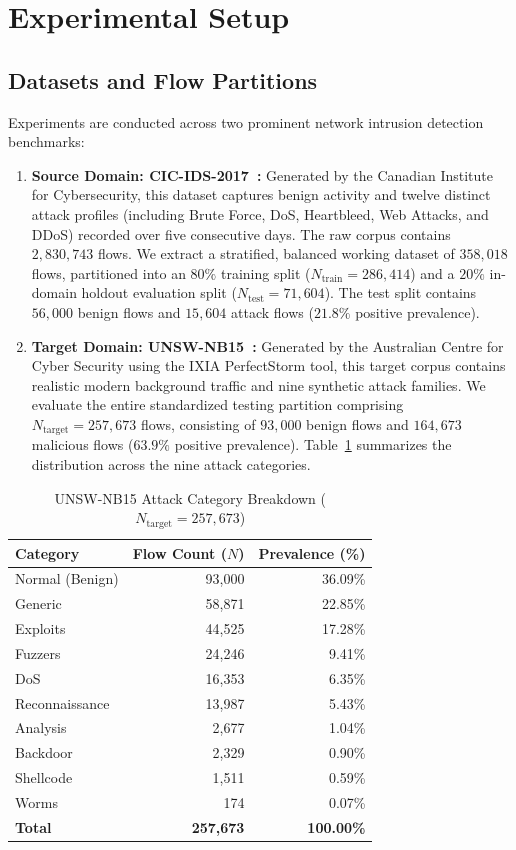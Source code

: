 \section{Experimental Setup}
\label{sec:setup}

\subsection{Datasets and Flow Partitions}
Experiments are conducted across two prominent network intrusion detection benchmarks:
\begin{enumerate}
    \item \textbf{Source Domain: CIC-IDS-2017~\cite{sharafaldin2018cicids}:} Generated by the Canadian Institute for Cybersecurity, this dataset captures benign activity and twelve distinct attack profiles (including Brute Force, DoS, Heartbleed, Web Attacks, and DDoS) recorded over five consecutive days. The raw corpus contains $2,830,743$ flows. We extract a stratified, balanced working dataset of $358,018$ flows, partitioned into an $80\%$ training split ($N_{\text{train}} = 286,414$) and a $20\%$ in-domain holdout evaluation split ($N_{\text{test}} = 71,604$). The test split contains $56,000$ benign flows and $15,604$ attack flows ($21.8\%$ positive prevalence).
    \item \textbf{Target Domain: UNSW-NB15~\cite{moustafa2015unsw}:} Generated by the Australian Centre for Cyber Security using the IXIA PerfectStorm tool, this target corpus contains realistic modern background traffic and nine synthetic attack families. We evaluate the entire standardized testing partition comprising $N_{\text{target}} = 257,673$ flows, consisting of $93,000$ benign flows and $164,673$ malicious flows ($63.9\%$ positive prevalence). Table~\ref{tab:attack_distribution} summarizes the distribution across the nine attack categories.
\end{enumerate}

\begin{table}[h]
\centering
\caption{UNSW-NB15 Attack Category Breakdown ($N_{\text{target}} = 257,673$)}
\label{tab:attack_distribution}
\renewcommand{\arraystretch}{1.1}
\begin{tabular}{lrr}
\hline
\textbf{Category} & \textbf{Flow Count ($N$)} & \textbf{Prevalence (\%)} \\
\hline
Normal (Benign) & 93,000 & 36.09\% \\
Generic & 58,871 & 22.85\% \\
Exploits & 44,525 & 17.28\% \\
Fuzzers & 24,246 & 9.41\% \\
DoS & 16,353 & 6.35\% \\
Reconnaissance & 13,987 & 5.43\% \\
Analysis & 2,677 & 1.04\% \\
Backdoor & 2,329 & 0.90\% \\
Shellcode & 1,511 & 0.59\% \\
Worms & 174 & 0.07\% \\
\hline
\textbf{Total} & \textbf{257,673} & \textbf{100.00\%} \\
\hline
\end{tabular}
\end{table}

